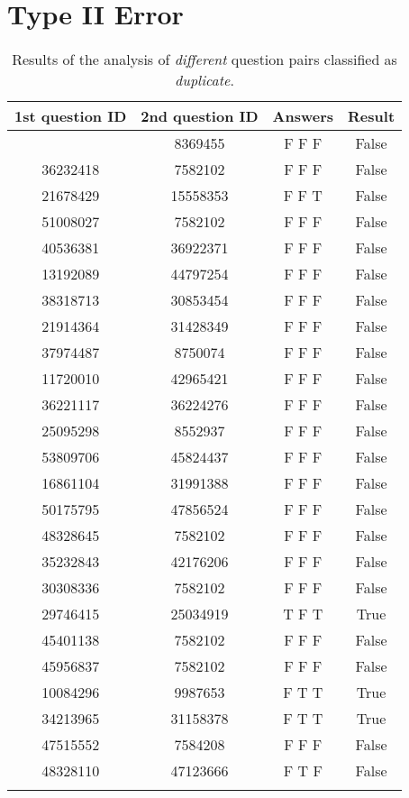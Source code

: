 \newpage
\section{Type II Error}
\begin{longtable}[c]{c c c c}
	\hline
	\textbf{1st question ID} & \textbf{2nd question ID} & \textbf{Answers} & \textbf{Result} \\ 
	\hline \hline
	\endfirsthead
	\hline
	\endhead
	\hline
	\endfoot
	\endlastfoot
	47261301 & 8369455 & F F F & False \\
	36232418 & 7582102 & F F F & False \\
	21678429 & 15558353 & F F T & False \\
	51008027 & 7582102 & F F F & False \\
	40536381 & 36922371 & F F F & False \\
	13192089 & 44797254 & F F F & False \\
	38318713 & 30853454 & F F F & False \\
	21914364 & 31428349 & F F F & False \\
	37974487 & 8750074 & F F F & False \\
	11720010 & 42965421 & F F F & False \\
	36221117 & 36224276 & F F F & False \\
	25095298 & 8552937 & F F F & False \\
	53809706 & 45824437 & F F F & False \\
	16861104 & 31991388 & F F F & False \\
	50175795 & 47856524 & F F F & False \\
	48328645 & 7582102 & F F F & False \\
	35232843 & 42176206 & F F F & False \\
	30308336 & 7582102 & F F F & False \\
	29746415 & 25034919 & T F T & True \\
	45401138 & 7582102 & F F F & False \\
	45956837 & 7582102 & F F F & False \\
	10084296 & 9987653 & F T T & True \\
	34213965 & 31158378 & F T T & True \\
	47515552 & 7584208 & F F F & False \\
	48328110 & 47123666 & F T F & False \\
	\hline
	\caption{Results of the analysis of \textit{different} question pairs classified as \textit{duplicate}.\label{survey_rror_ii}}\\
\end{longtable}
